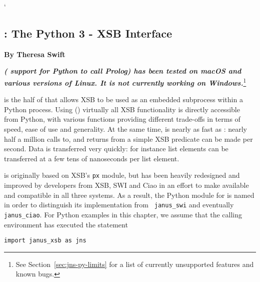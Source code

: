 `\setcounter{secnumdepth}{3}
\begin{center}
\chapter{\janus{}: The Python 3 - XSB Interface} \label{chap:janus-py}
\end{center}

\vspace*{-.30in} 
\begin{center}
{\Large {\bf  \jnsversion}}
\end{center}

\begin{center}
  {\Large {\bf By Theresa Swift}}
\end{center}


\noindent
    {\large {\bf {\em \januspy{} (\janus{} support for Python to call
          Prolog) has been tested on macOS and various versions of
        Linux. It is not currently working on Windows.}}\footnote{ See
    Section~\ref{sec:jns-py-limits} for a list of currently
    unsupported features and known bugs.}}

\januspy{} is the half of \janus{} that allows XSB to be used as an
embedded subprocess within a Python process. Using \januspy()
virtually all XSB functionality is directly accessible from Python, with
various \januspy{} functions providing different trade-offs in terms of
speed, ease of use and generality.  At the same time, \januspy{} is
nearly as fast as \janusplg : nearly half a million calls to,
and returns from a simple XSB predicate can be made per second.  Data
is transferred very quickly: for instance list elements can be
transferred at a few tens of nanoseconds per list element.

\januspy{} is originally based on XSB's {\tt px} module, but has been
heavily redesigned and improved by developers from XSB, SWI and Ciao
in an effort to make \janus{} available and compatible in all three
systems.  As a result, the Python module for \januspy{} is named
\janusxsb{} in order to distinguish its implementation from {\tt
  janus\_swi} and eventually {\tt janus\_ciao}.  For Python examples
in this chapter, we assume that the calling environment has executed
the statement
\begin{verbatim} 
import janus_xsb as jns
\end{verbatim}



